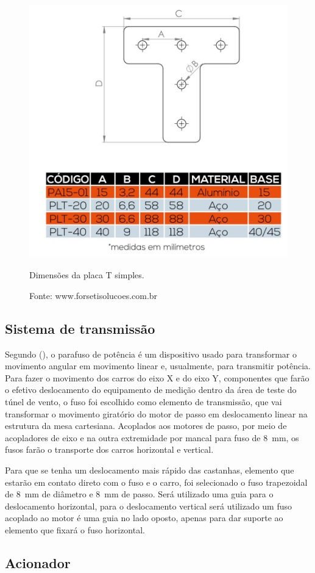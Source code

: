 \begin{figure}[H]
\centering
\includegraphics[width = 0.5\linewidth]{figuras/placatd}
\caption{Dimensões da placa T simples.}
\caption*{Fonte: www.forsetisolucoes.com.br}
\label{fig:placatd}
\end{figure}

\subsection{Sistema de transmissão}\label{subsec:mettransmissao}

Segundo \citeauthor{budynas2016elementos} (\citeyear{budynas2016elementos}), o parafuso de potência 
é um dispositivo usado para transformar o movimento angular em movimento linear e, usualmente, 
para transmitir potência. Para fazer o movimento dos carros do eixo X e do eixo Y, 
componentes que farão o efetivo deslocamento do equipamento de medição dentro da área de 
teste do túnel de vento, o fuso foi escolhido como elemento de transmissão, que vai transformar 
o movimento giratório do motor de passo em deslocamento linear na estrutura da mesa cartesiana. 
Acoplados aos motores de passo, por meio de acopladores de eixo e na outra extremidade por mancal para fuso 
de 8~mm, os fusos farão o transporte dos carros horizontal e vertical. 

Para que se tenha um deslocamento mais rápido das castanhas, elemento que estarão em contato 
direto com o fuso e o carro, foi selecionado o fuso trapezoidal de 8~mm de diâmetro e 8~mm de passo. 
Será utilizado uma guia para o deslocamento horizontal, para o deslocamento vertical será utilizado 
um fuso acoplado ao motor é uma guia no lado oposto, apenas para dar suporte ao elemento que fixará 
o fuso horizontal.

\subsection{Acionador}\label{subsec:metacionador}

